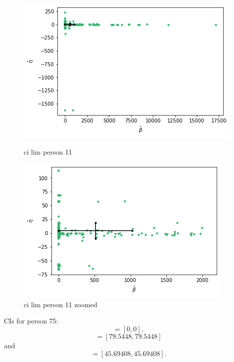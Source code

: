 \begin{figure}
    \centering
    \begin{minipage}{0.48\textwidth}
        \centering
        \includegraphics[scale=0.37]{pictures/ci_lim_b_e_person11.png}
        \caption{ci lim person 11}
        \label{fig:ci_lim_b_e_person_11}
    \end{minipage}\hfill
    \begin{minipage}{0.48\textwidth}
        \centering
        \includegraphics[scale=0.37]{pictures/ci_lim_b_e_person11_zoomed.png}
        \caption{ci lim person 11 zoomed}
        \label{fig:ci_lim_b_e_person_11_zoomed}
    \end{minipage}
\end{figure}



CIs for person 75:
\begin{equation*}
    [\hat{\alpha}^{*(5)}_{1000},\hat{\alpha}^{*(95)}_{1000}] = [0,0],
\end{equation*}
\begin{equation*}
    [\hb^{*(5)}_{1000},\hb^{*(95)}_{1000}] = [79.5448,79.5448]
\end{equation*}
and
\begin{equation*}
    [\hat{\eta}^{*(5)}_{1000},\hat{\eta}^{*(95)}_{1000}] = [45.69408,45.69408].
\end{equation*}








